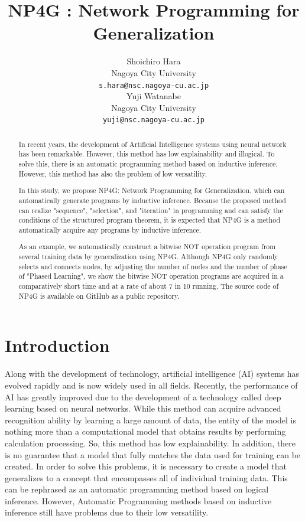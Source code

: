 \documentclass{article}
\title{NP4G : Network Programming for Generalization
}
\author{
  Shoichiro Hara \\
  Nagoya City University \\
  \texttt{s.hara@nsc.nagoya-cu.ac.jp} \\
   \And
  Yuji Watanabe \\
  Nagoya City University \\
  \texttt{yuji@nsc.nagoya-cu.ac.jp} \\
}
\begin{document}
\maketitle

\begin{abstract}
In recent years, the development of Artificial Intelligence systems using neural network has been remarkable. 
However, this method has low explainability and illogical.
To solve this, there is an automatic programming method based on inductive inference.
However, this method has also the problem of low versatility.
 
 In this study, we propose NP4G: Network Programming for Generalization, which can automatically generate programs by inductive inference. 
Because the proposed method can realize "sequence", "selection", and "iteration" in programming and can satisfy the conditions of the structured program theorem, it is expected that NP4G is a method automatically acquire any programs by inductive inference.
 
 As an example, we automatically construct a bitwise NOT operation program from several training data by generalization using NP4G. 
 Although NP4G only randomly selects and connects nodes, by adjusting the number of nodes and the number of phase of "Phased Learning", we show the bitwise NOT operation programs are acquired in a comparatively short time and at a rate of about 7 in 10 running.
 The source code of NP4G is available on GitHub as a public repository\footnotemark[1].
\end{abstract}



\section{Introduction}
Along with the development of technology, artificial intelligence (AI) systems has evolved rapidly and is now widely used in all fields.
Recently, the performance of AI has greatly improved due to the development of a technology called deep learning based on neural networks.
While this method can acquire advanced recognition ability by learning a large amount of data, the entity of the model is nothing more than a computational model that obtains results by performing calculation processing. 
So, this method has low explainability.
In addition, there is no guarantee that a model that fully matches the data used for training can be created.
In order to solve this problems, it is necessary to create a model that generalizes to a concept that encompasses all of individual training data.
This can be rephrased as an automatic programming method based on logical inference.
However, Automatic Programming methods based on inductive inference still have problems due to their low versatility.
\end{document}
